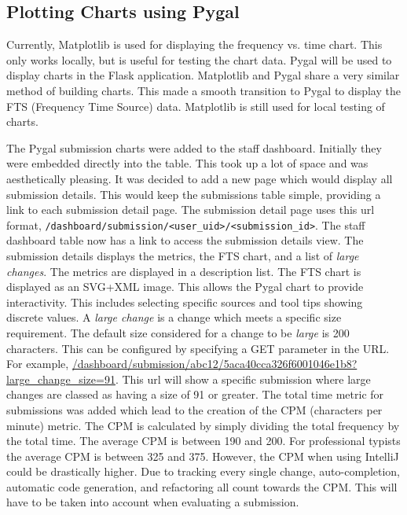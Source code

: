 \subsection{Plotting Charts using Pygal}
Currently, Matplotlib is used for displaying the frequency vs. time chart. This only works locally, but is useful for testing the chart data. Pygal will be used to display charts in the Flask application\cite{PygalFlask}. Matplotlib and Pygal share a very similar method of building charts. This made a smooth transition to Pygal to display the FTS (Frequency Time Source) data. Matplotlib is still used for local testing of charts.

The Pygal submission charts were added to the staff dashboard. Initially they were embedded directly into the table. This took up a lot of space and was aesthetically pleasing. It was decided to add a new page which would display all submission details. This would keep the submissions table simple, providing a link to each submission detail page. The submission detail page uses this url format, \texttt{/dashboard/submission/<user\_uid>/<submission\_id>}. The staff dashboard table now has a link to access the submission details view. The submission details displays the metrics, the FTS chart, and a list of \textit{large changes}. The metrics are displayed in a description list. The FTS chart is displayed as an SVG+XML image. This allows the Pygal chart to provide interactivity. This includes selecting specific sources and tool tips showing discrete values. A \textit{large change} is a change which meets a specific size requirement. The default size considered for a change to be \textit{large} is 200 characters. This can be configured by specifying a GET parameter in the URL. For example, \url{/dashboard/submission/abc12/5aca40cca326f6001046e1b8?large\_change\_size=91}. This url will show a specific submission where large changes are classed as having a size of 91 or greater. The total time metric for submissions was added which lead to the creation of the CPM (characters per minute) metric. The CPM is calculated by simply dividing the total frequency by the total time. The average CPM is between 190 and 200\cite{LiveChatTypingSpeedTest}. For professional typists the average CPM is between 325 and 375. However, the CPM when using IntelliJ could be drastically higher. Due to tracking every single change, auto-completion, automatic code generation, and refactoring all count towards the CPM. This will have to be taken into account when evaluating a submission.

